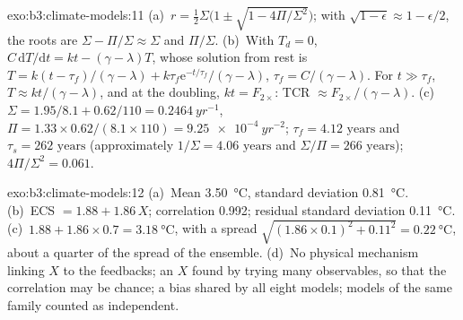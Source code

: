 \begin{solution}{exo:b3:climate-models:11}
(a)~$r = \tfrac12\Sigma\big(1 \pm \sqrt{1 - 4\Pi/\Sigma^2}\big)$; with
$\sqrt{1 - \epsilon} \approx 1 - \epsilon/2$, the roots are $\Sigma -
\Pi/\Sigma \approx \Sigma$ and $\Pi/\Sigma$. (b)~With $T_d = 0$, $C\,\mathrm
dT/\mathrm dt = kt - (\gamma - \lambda)T$, whose solution from rest is $T =
k(t - \tau_f)/(\gamma - \lambda) + k\tau_f\mathrm e^{-t/\tau_f}/(\gamma -
\lambda)$, $\tau_f = C/(\gamma - \lambda)$. For $t \gg \tau_f$, $T \approx
kt/(\gamma - \lambda)$, and at the doubling, $kt = F_{2\times}$: TCR
$\approx F_{2\times}/(\gamma - \lambda)$. (c)~$\Sigma = 1.95/8.1 +
0.62/110 = \qty{0.2464}{yr^{-1}}$, $\Pi = 1.33\times0.62/(8.1\times110) =
\qty{9.25e-4}{yr^{-2}}$; $\tau_f = \num{4.12}\text{ years}$ and $\tau_s =
\num{262}\text{ years}$ (approximately $1/\Sigma = \num{4.06}\text{ years}$ and
$\Sigma/\Pi = \num{266}\text{ years}$); $4\Pi/\Sigma^2 = 0.061$.
\end{solution}

\begin{solution}{exo:b3:climate-models:12}
(a)~Mean \qty{3.50}{\celsius}, standard deviation \qty{0.81}{\celsius}.
(b)~ECS $= 1.88 + 1.86\,X$; correlation \num{0.992}; residual standard
deviation \qty{0.11}{\celsius}. (c)~$1.88 + 1.86\times0.7 =
\qty{3.18}{\celsius}$, with a spread $\sqrt{(1.86\times0.1)^2 + 0.11^2} =
\qty{0.22}{\celsius}$, about a quarter of the spread of the ensemble.
(d)~No physical mechanism linking $X$ to the feedbacks; an $X$ found by
trying many observables, so that the correlation may be chance; a bias
shared by all eight models; models of the same family counted as
independent.
\end{solution}

